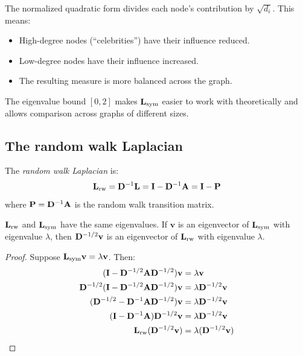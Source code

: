 \begin{notechapter}
\begin{intuition}
The normalized quadratic form divides each node's contribution by $\sqrt{d_i}$. This means:
\begin{itemize}
    \item High-degree nodes (``celebrities'') have their influence reduced.
    \item Low-degree nodes have their influence increased.
    \item The resulting measure is more balanced across the graph.
\end{itemize}
The eigenvalue bound $[0,2]$ makes $\mathbf{L}_{\text{sym}}$ easier to work with theoretically and allows comparison across graphs of different sizes.
\end{intuition}

\subsection{The random walk Laplacian}

\begin{definition}\label{graph-laplacians:def:rw-laplacian}
The \emph{random walk Laplacian} is:
\begin{equation}
\mathbf{L}_{\text{rw}} = \mathbf{D}^{-1} \mathbf{L} = \mathbf{I} - \mathbf{D}^{-1} \mathbf{A} = \mathbf{I} - \mathbf{P}
\label{graph-laplacians:eq:rw-laplacian}
\end{equation}
where $\mathbf{P} = \mathbf{D}^{-1}\mathbf{A}$ is the random walk transition matrix.
\end{definition}

\begin{theorem}\label{graph-laplacians:thm:laplacian-similarity}
$\mathbf{L}_{\text{rw}}$ and $\mathbf{L}_{\text{sym}}$ have the same eigenvalues. If $\mathbf{v}$ is an eigenvector of $\mathbf{L}_{\text{sym}}$ with eigenvalue $\lambda$, then $\mathbf{D}^{-1/2}\mathbf{v}$ is an eigenvector of $\mathbf{L}_{\text{rw}}$ with eigenvalue $\lambda$.
\end{theorem}

\begin{proof}
Suppose $\mathbf{L}_{\text{sym}} \mathbf{v} = \lambda \mathbf{v}$. Then:
\begin{align}
(\mathbf{I} - \mathbf{D}^{-1/2}\mathbf{A}\mathbf{D}^{-1/2})\mathbf{v} &= \lambda \mathbf{v} \\
\mathbf{D}^{-1/2}(\mathbf{I} - \mathbf{D}^{-1/2}\mathbf{A}\mathbf{D}^{-1/2})\mathbf{v} &= \lambda \mathbf{D}^{-1/2}\mathbf{v} \\
(\mathbf{D}^{-1/2} - \mathbf{D}^{-1}\mathbf{A}\mathbf{D}^{-1/2})\mathbf{v} &= \lambda \mathbf{D}^{-1/2}\mathbf{v} \\
(\mathbf{I} - \mathbf{D}^{-1}\mathbf{A})\mathbf{D}^{-1/2}\mathbf{v} &= \lambda \mathbf{D}^{-1/2}\mathbf{v} \\
\mathbf{L}_{\text{rw}} (\mathbf{D}^{-1/2}\mathbf{v}) &= \lambda (\mathbf{D}^{-1/2}\mathbf{v}) \qedhere
\end{align}
\end{proof}


\end{notechapter}
